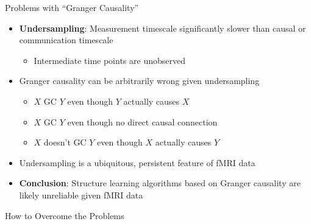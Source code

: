 \documentclass[final,hyperref={pdfpagelabels=false}]{beamer}
\begin{document}
\begin{frame}{}
\begin{columns}[t]
\begin{column}{.48\linewidth}
\begin{block}{\Large Problems with ``Granger Causality''}
\begin{itemize}
          \item \textbf{Undersampling}: Measurement timescale significantly slower than
          causal or communication timescale 
          \begin{itemize} \item Intermediate time points are unobserved \end{itemize}
          
          \item Granger causality can be arbitrarily wrong given undersampling
          \begin{itemize}
            \item $X$ GC $Y$ even though $Y$ actually causes $X$
            \item $X$ GC $Y$ even though no direct causal connection
            \item $X$ doesn't GC $Y$ even though $X$ actually causes $Y$
            \end{itemize}
          
          \item Undersampling is a ubiquitous, persistent feature of fMRI data
          
          \item \textbf{Conclusion}: Structure learning algorithms based on Granger causality
          are likely unreliable given fMRI data
          \end{itemize}
        \end{block}

        \begin{block}{\Large How to Overcome the Problems}
          \begin{minipage}{0.5\textwidth}
            \vspace{10 mm}
            \LinesNumberedHidden
\end{minipage}
\end{block}
\end{column}
\end{columns}
\end{frame}
\end{document}
